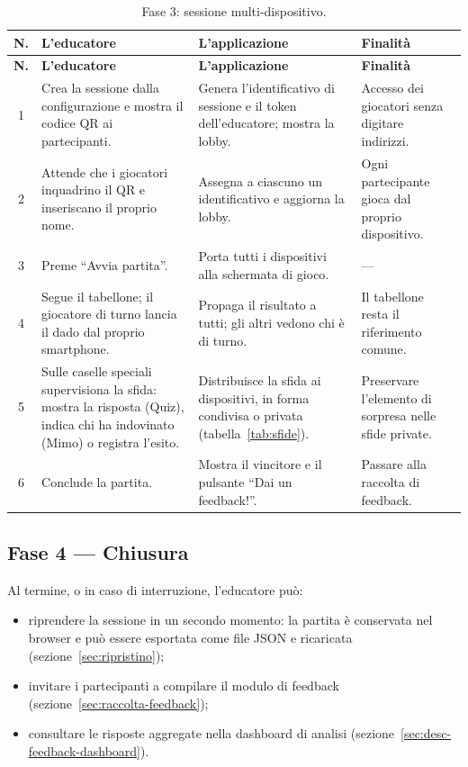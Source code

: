 \documentclass[12pt]{report}
\begin{document}
\begingroup\small
\begin{longtable}{@{}c p{3.9cm} p{3.9cm} p{3.4cm}@{}}
\caption{Fase 3: sessione multi-dispositivo.}\label{tab:sb-multi}\\
\hline
\textbf{N.} & \textbf{L'educatore} & \textbf{L'applicazione} & \textbf{Finalità} \\ \hline
\endfirsthead
\hline
\textbf{N.} & \textbf{L'educatore} & \textbf{L'applicazione} & \textbf{Finalità} \\ \hline
\endhead
1 & Crea la sessione dalla configurazione e mostra il codice QR ai partecipanti. & Genera l'identificativo di sessione e il token dell'educatore; mostra la lobby. & Accesso dei giocatori senza digitare indirizzi. \\ \hline
2 & Attende che i giocatori inquadrino il QR e inseriscano il proprio nome. & Assegna a ciascuno un identificativo e aggiorna la lobby. & Ogni partecipante gioca dal proprio dispositivo. \\ \hline
3 & Preme ``Avvia partita''. & Porta tutti i dispositivi alla schermata di gioco. & --- \\ \hline
4 & Segue il tabellone; il giocatore di turno lancia il dado dal proprio smartphone. & Propaga il risultato a tutti; gli altri vedono chi è di turno. & Il tabellone resta il riferimento comune. \\ \hline
5 & Sulle caselle speciali supervisiona la sfida: mostra la risposta (Quiz), indica chi ha indovinato (Mimo) o registra l'esito. & Distribuisce la sfida ai dispositivi, in forma condivisa o privata (tabella~\ref{tab:sfide}). & Preservare l'elemento di sorpresa nelle sfide private. \\ \hline
6 & Conclude la partita. & Mostra il vincitore e il pulsante ``Dai un feedback!''. & Passare alla raccolta di feedback. \\ \hline
\end{longtable}
\endgroup

\subsection{Fase 4 --- Chiusura}

Al termine, o in caso di interruzione, l'educatore può:

\begin{itemize}
    \item riprendere la sessione in un secondo momento: la partita è conservata nel browser e può essere esportata come file JSON e ricaricata (sezione~\ref{sec:ripristino});
    \item invitare i partecipanti a compilare il modulo di feedback (sezione~\ref{sec:raccolta-feedback});
    \item consultare le risposte aggregate nella dashboard di analisi (sezione~\ref{sec:desc-feedback-dashboard}).
\end{itemize}
\end{document}
